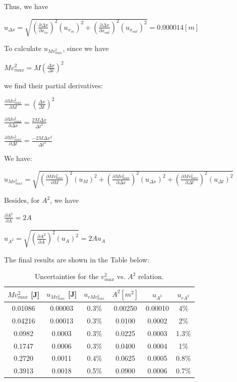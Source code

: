 \documentclass[a4paper,12pt]{article}
\begin{document}
\begin{appendices}
\begin{center}
\end{center}
Thus, we have
\begin{center}
$\displaystyle u_{\Delta x} = \sqrt{(\frac{\partial \Delta x}{\partial x_{in}})^2(u_{x_{in}})^2 + ( \frac{\partial \Delta x}{\partial x_{out}})^2(u_{x_{out}})^2} = 0.000014 [m] $
\end{center}
\par To calculate $u_{Mv_{max}^2}$, since we have
\begin{center}
$\displaystyle Mv_{max}^2 = M(\frac{\Delta x}{\Delta t})^2$
\end{center}
we find their partial derivatives:
\begin{center}
$\displaystyle \frac{\partial Mv_{max}^2}{\partial M} = (\frac{\Delta x}{\Delta t})^2$
\end{center}
\begin{center}
$\displaystyle \frac{\partial Mv_{max}^2}{\partial \Delta x} =\frac{2 M \Delta x}{\Delta t^2} $
\end{center}
\begin{center}
$\displaystyle \frac{\partial Mv_{max}^2}{\partial \Delta t} =\frac{-2 M \Delta x^2}{\Delta t^3} $
\end{center}
We have:
\begin{center}
$\displaystyle u_{Mv_{max}^2} =\sqrt{(\frac{\partial Mv_{max}^2}{\partial M})^2(u_M)^2 + (\frac{\partial Mv_{max}^2}{\partial \Delta x})^2(u_{\Delta x})^2 + (\frac{\partial Mv_{max}^2}{\partial \Delta t} )^2(u_{\Delta t})^2} $
\end{center}
\par Besides, for $A^2$, we have 
\begin{center}
$\displaystyle \frac{\partial A^2}{\partial A} = 2A $
\end{center}
\begin{center}
$\displaystyle u_{A^2} = \sqrt{(\frac{\partial A^2}{\partial A})^2(u_A)^2} = 2Au_A$
\end{center}
The final results are shown in the Table below:
\begin{table}[h]
\begin{center}
\begin{tabular}{|c|c|c||c|c|c|}
\hline
$ Mv_{max}^2 $ [J] & $u_{Mv_{max}^2}$ [J] & $u_{rMv_{max}^2}$ & $A^2 [m^2]$ & $ u_{A^2} $ & $ u_{rA^2}$ \\
\hline
0.01086 & 0.00003 &  0.3\%  & 0.00250 & 0.00010 & 4\%\\
0.04216 & 0.00013 &  0.3\%  & 0.0100 & 0.0002 & 2\%\\
0.0982 & 0.0003 &  0.3\%  & 0.0225 & 0.0003 & 1.3\%\\
0.1747 & 0.0006 &  0.3\%  & 0.0400 & 0.0004 & 1\%\\
0.2720 & 0.0011 &  0.4\%  & 0.0625 & 0.0005 & 0.8\%\\
0.3913 & 0.0018 &  0.5\%  & 0.0900 & 0.0006 & 0.7\%\\
\hline
\end{tabular}
\end{center}
\caption{Uncertainties for the $v_{max}^2$ vs. $A^2$ relation.}
\end{table}


\end{appendices}
\end{document}
